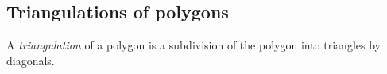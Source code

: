 \subsection{Triangulations of polygons}
A \emph{triangulation} of a polygon is a subdivision of the polygon into triangles by diagonals.
